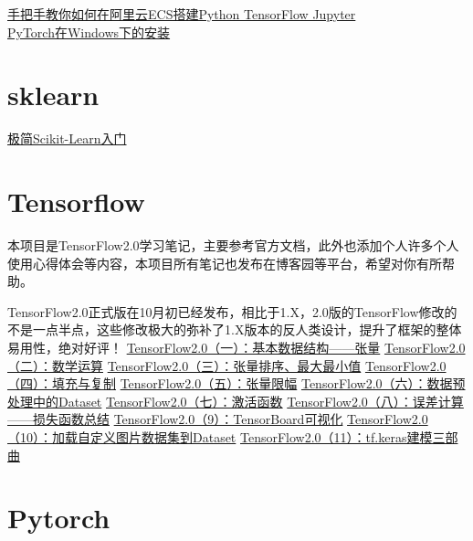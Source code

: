 \documentclass[
]{book}
\begin{document}
\href{https://mp.weixin.qq.com/s?__biz=MzA4MjYwMTc5Nw==\&mid=2648931932\&idx=3\&sn=9654d036e8f02a2cb471a1793786b829\&chksm=8794ec76b0e365604dacfdad895721104142e7ee532c4905992c974462e84ac0446d501ecdf6\&token=2004915986\&lang=en_US\#rd}{手把手教你如何在阿里云ECS搭建Python TensorFlow Jupyter}\\
\href{https://mp.weixin.qq.com/s?__biz=MzA4MjYwMTc5Nw==\&mid=2648931156\&idx=3\&sn=2eaff48b1c3e08fc8c2498597ec74fda\&chksm=8794e97eb0e36068d1446e7ea6207080c7fede6dc43f5f960188f5d4e0faf10a6e5030916630\&token=2004915986\&lang=en_US\#rd}{PyTorch在Windows下的安装}

\hypertarget{sklearn}{%
\section{sklearn}\label{sklearn}}

\href{https://mp.weixin.qq.com/s?__biz=MzA4MjYwMTc5Nw==\&mid=2648929856\&idx=1\&sn=0a6ce240f46bea7d74f2a850625de832\&chksm=8794e46ab0e36d7c449579513e69fbbc957ac61eac10c6f863ed4a860debd3dca1ed0ba442c2\&token=2004915986\&lang=en_US\#rd}{极简Scikit-Learn入门}

\hypertarget{tensorflow}{%
\section{Tensorflow}\label{tensorflow}}

本项目是TensorFlow2.0学习笔记，主要参考官方文档，此外也添加个人许多个人使用心得体会等内容，本项目所有笔记也发布在博客园等平台，希望对你有所帮助。

TensorFlow2.0正式版在10月初已经发布，相比于1.X，2.0版的TensorFlow修改的不是一点半点，这些修改极大的弥补了1.X版本的反人类设计，提升了框架的整体易用性，绝对好评！
\href{}{TensorFlow2.0（一）：基本数据结构------张量}
\href{}{TensorFlow2.0（二）：数学运算}
\href{}{TensorFlow2.0（三）：张量排序、最大最小值}
\href{}{TensorFlow2.0（四）：填充与复制}
\href{}{TensorFlow2.0（五）：张量限幅}
\href{}{TensorFlow2.0（六）：数据预处理中的Dataset}
\href{}{TensorFlow2.0（七）：激活函数}
\href{}{TensorFlow2.0（八）：误差计算------损失函数总结}
\href{}{TensorFlow2.0（9）：TensorBoard可视化}
\href{}{TensorFlow2.0（10）：加载自定义图片数据集到Dataset}
\href{}{TensorFlow2.0（11）：tf.keras建模三部曲}

\hypertarget{pytorch}{%
\section{Pytorch}\label{pytorch}}
\end{document}
